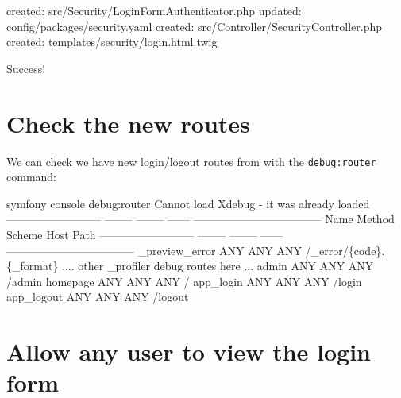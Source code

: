 \documentclass[a4paperpaper,openright]{book}
\newenvironment{Shaded}{}{}
\newcommand{\DataTypeTok}[1]{\textcolor[rgb]{0.56,0.13,0.00}{#1}}
\newcommand{\ExtensionTok}[1]{#1}
\newcommand{\NormalTok}[1]{#1}
\begin{document}
\begin{Shaded}
\begin{Highlighting}[]
     \ExtensionTok{created}\NormalTok{: src/Security/LoginFormAuthenticator.php}
     \ExtensionTok{updated}\NormalTok{: config/packages/security.yaml}
     \ExtensionTok{created}\NormalTok{: src/Controller/SecurityController.php}
     \ExtensionTok{created}\NormalTok{: templates/security/login.html.twig}

      \ExtensionTok{Success}\NormalTok{! }
\end{Highlighting}
\end{Shaded}

\hypertarget{check-the-new-routes}{%
\section{Check the new routes}\label{check-the-new-routes}}

We can check we have new login/logout routes from with the
\texttt{debug:router} command:

\begin{Shaded}
\begin{Highlighting}[]
     \ExtensionTok{symfony}\NormalTok{ console debug:router}
    \ExtensionTok{Cannot}\NormalTok{ load Xdebug - it was already loaded}
     \ExtensionTok{--------------------------}\NormalTok{ -------- -------- ------ ----------------------------------- }
      \ExtensionTok{Name}\NormalTok{                       Method   Scheme   Host   Path                               }
     \ExtensionTok{--------------------------}\NormalTok{ -------- -------- ------ ----------------------------------- }
      \ExtensionTok{_preview_error}\NormalTok{             ANY      ANY      ANY    /_error/}\DataTypeTok{\{code\}}\NormalTok{.}\DataTypeTok{\{_format\}}           
        \ExtensionTok{....}\NormalTok{ other _profiler debug routes here ...}
      \ExtensionTok{admin}\NormalTok{                      ANY      ANY      ANY    /admin                             }
      \ExtensionTok{homepage}\NormalTok{                   ANY      ANY      ANY    /                                  }
      \ExtensionTok{app_login}\NormalTok{                  ANY      ANY      ANY    /login                             }
      \ExtensionTok{app_logout}\NormalTok{                 ANY      ANY      ANY    /logout          }
\end{Highlighting}
\end{Shaded}

\hypertarget{allow-any-user-to-view-the-login-form}{%
\section{\texorpdfstring{Allow \textbf{any} user to view the login
form}{Allow any user to view the login form}}\label{allow-any-user-to-view-the-login-form}}
\end{document}
